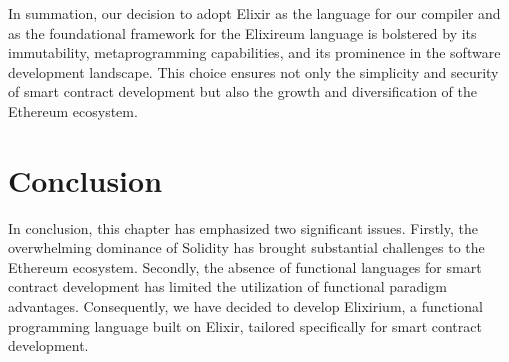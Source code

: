 In summation, our decision to adopt Elixir as the language for our compiler and as the foundational framework for the Elixireum language is bolstered by its immutability, metaprogramming capabilities, and its prominence in the software development landscape. This choice ensures not only the simplicity and security of smart contract development but also the growth and diversification of the Ethereum ecosystem.

\section{Conclusion}
\label{sec:conc}

In conclusion, this chapter has emphasized two significant issues. Firstly, the overwhelming dominance of Solidity has brought substantial challenges to the Ethereum ecosystem. Secondly, the absence of functional languages for smart contract development has limited the utilization of functional paradigm advantages. Consequently, we have decided to develop Elixirium, a functional programming language built on Elixir, tailored specifically for smart contract development.
